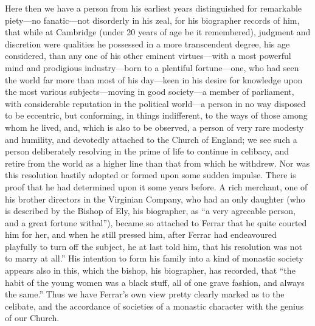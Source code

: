 Here then we have a person from his earliest years
distinguished for remarkable piety—no fanatic—not disorderly in his
zeal, for his biographer records of him, that while at Cambridge (under
20 years of age be it remembered), judgment and discretion were
qualities he possessed in a more transcendent degree, his age
considered, than any one of his other eminent virtues—with a most
powerful mind and prodigious industry—born to a plentiful
fortune—one, who had seen the world far more than most of his
day—keen in his desire for knowledge upon the most various
subjects—moving in good society—a member of parliament, with
considerable reputation in the political world—a person in no way
disposed to be eccentric, but conforming, in things indifferent, to the
ways of those among whom he lived, and, which is also to be observed, a
person of very rare modesty and humility, and devotedly attached to the
Church of England; we see such a person deliberately resolving in the
prime of life to continue in celibacy, and retire from the world as a
higher line than that from which he withdrew. Nor was this resolution
hastily adopted or formed upon some sudden impulse. There is proof that
he had determined upon it some years before. A rich merchant, one of his
brother directors in the Virginian Company, who had an only daughter
(who is described by the Bishop of Ely, his biographer, as ``a very
agreeable person, and a great fortune withal''), became so attached to
Ferrar that he quite courted him for her, and when he still pressed him,
after Ferrar had endeavoured playfully to turn off the subject, he at
last told him, that his resolution was not to marry at all.'' His
intention to form his family into a kind of monastic society appears
also in this, which the bishop, his biographer, has recorded, that ``the
habit of the young women was a black stuff, all of one grave fashion,
and always the same.'' Thus we have Ferrar's own view pretty clearly
marked as to the celibate, and the accordance of societies of a monastic
character with the genius of our Church.

